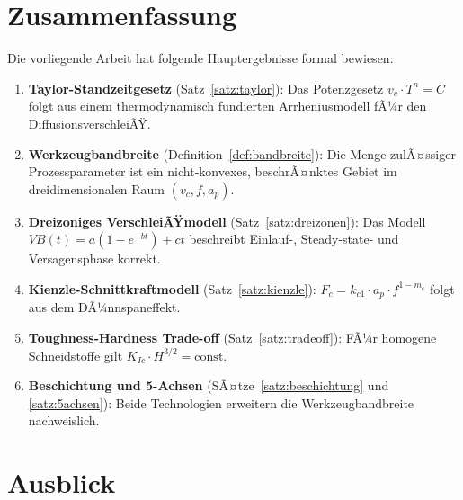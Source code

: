 ﻿\documentclass[a4paper,12pt]{article}
\theoremstyle{definition}
\begin{document}
\section{Zusammenfassung}
\label{sec:zusammenfassung}

Die vorliegende Arbeit hat folgende Hauptergebnisse formal bewiesen:

\begin{enumerate}
  \item \textbf{Taylor-Standzeitgesetz} (Satz~\ref{satz:taylor}): Das Potenzgesetz
        $v_c \cdot T^n = C$ folgt aus einem thermodynamisch fundierten
        Arrheniusmodell fÃ¼r den DiffusionsverschleiÃŸ.
  \item \textbf{Werkzeugbandbreite} (Definition~\ref{def:bandbreite}): Die Menge
        zulÃ¤ssiger Prozessparameter ist ein nicht-konvexes, beschrÃ¤nktes Gebiet
        im dreidimensionalen Raum $(v_c, f, a_p)$.
  \item \textbf{Dreizoniges VerschleiÃŸmodell} (Satz~\ref{satz:dreizonen}): Das
        Modell $VB(t) = a(1-e^{-bt}) + ct$ beschreibt Einlauf-, Steady-state-
        und Versagensphase korrekt.
  \item \textbf{Kienzle-Schnittkraftmodell} (Satz~\ref{satz:kienzle}): $F_c = k_{c1} \cdot a_p \cdot f^{1-m_c}$
        folgt aus dem DÃ¼nnspaneffekt.
  \item \textbf{Toughness-Hardness Trade-off} (Satz~\ref{satz:tradeoff}): FÃ¼r
        homogene Schneidstoffe gilt $K_{Ic} \cdot H^{3/2} = \text{const.}$
  \item \textbf{Beschichtung und 5-Achsen} (SÃ¤tze~\ref{satz:beschichtung}
        und \ref{satz:5achsen}): Beide Technologien erweitern die
        Werkzeugbandbreite nachweislich.
\end{enumerate}

\section{Ausblick}
\label{sec:ausblick}
\end{document}
